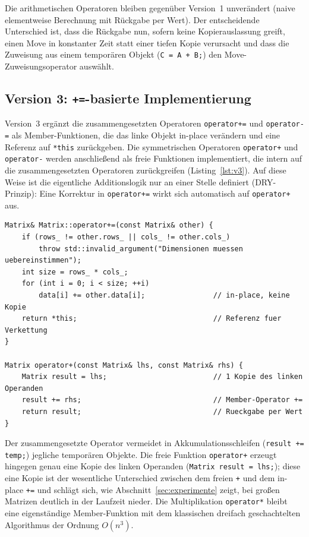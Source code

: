\documentclass[10pt,a4paper]{article}
\begin{document}
Die arithmetischen Operatoren bleiben gegenüber Version~1 unverändert (naive
elementweise Berechnung mit Rückgabe per Wert). Der entscheidende Unterschied
ist, dass die Rückgabe nun, sofern keine Kopierauslassung greift, einen Move in
konstanter Zeit statt einer tiefen Kopie verursacht und dass die Zuweisung aus
einem temporären Objekt (\texttt{C = A + B;}) den Move-Zuweisungsoperator
auswählt.

\subsection{Version 3: \texttt{+=}-basierte Implementierung}
\label{sec:v3}

Version~3 ergänzt die zusammengesetzten Operatoren \texttt{operator+=} und
\texttt{operator-=} als Member-Funktionen, die das linke Objekt in-place
verändern und eine Referenz auf \texttt{*this} zurückgeben. Die symmetrischen
Operatoren \texttt{operator+} und \texttt{operator-} werden anschließend als
freie Funktionen implementiert, die intern auf die zusammengesetzten Operatoren
zurückgreifen (Listing~\ref{lst:v3}). Auf diese Weise ist die eigentliche
Additionslogik nur an einer Stelle definiert (DRY-Prinzip): Eine Korrektur in
\texttt{operator+=} wirkt sich automatisch auf \texttt{operator+} aus.

\begin{lstlisting}[caption={V3: In-place-Operator als Member, freie Funktion auf dessen Basis}, label={lst:v3}]
Matrix& Matrix::operator+=(const Matrix& other) {
    if (rows_ != other.rows_ || cols_ != other.cols_)
        throw std::invalid_argument("Dimensionen muessen uebereinstimmen");
    int size = rows_ * cols_;
    for (int i = 0; i < size; ++i)
        data[i] += other.data[i];                // in-place, keine Kopie
    return *this;                                // Referenz fuer Verkettung
}

Matrix operator+(const Matrix& lhs, const Matrix& rhs) {
    Matrix result = lhs;                         // 1 Kopie des linken Operanden
    result += rhs;                               // Member-Operator +=
    return result;                               // Rueckgabe per Wert
}
\end{lstlisting}

Der zusammengesetzte Operator vermeidet in Akkumulationsschleifen
(\texttt{result += temp;}) jegliche temporären Objekte. Die freie Funktion
\texttt{operator+} erzeugt hingegen genau eine Kopie des linken Operanden
(\texttt{Matrix result = lhs;}); diese eine Kopie ist der wesentliche Unterschied
zwischen dem freien \texttt{+} und dem in-place \texttt{+=} und schlägt sich,
wie Abschnitt~\ref{sec:experimente} zeigt, bei großen Matrizen deutlich in der
Laufzeit nieder. Die Multiplikation \texttt{operator*} bleibt eine eigenständige
Member-Funktion mit dem klassischen dreifach geschachtelten Algorithmus der
Ordnung $O(n^3)$.
\end{document}
